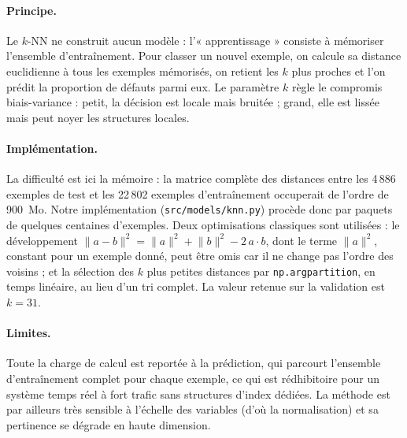 \paragraph{Principe.}
Le $k$-NN \cite{cover1967knn} ne construit aucun modèle : l'« apprentissage »
consiste à mémoriser l'ensemble d'entraînement. Pour classer un nouvel exemple,
on calcule sa distance euclidienne à tous les exemples mémorisés, on retient
les $k$ plus proches et l'on prédit la proportion de défauts parmi eux. Le
paramètre $k$ règle le compromis biais-variance : petit, la décision est locale
mais bruitée ; grand, elle est lissée mais peut noyer les structures locales.

\paragraph{Implémentation.}
La difficulté est ici la mémoire : la matrice complète des distances entre les
4\,886 exemples de test et les 22\,802 exemples d'entraînement occuperait de
l'ordre de 900~Mo. Notre implémentation (\texttt{src/models/knn.py}) procède
donc par paquets de quelques centaines d'exemples. Deux optimisations
classiques sont utilisées : le développement
$\lVert a - b \rVert^2 = \lVert a \rVert^2 + \lVert b \rVert^2 - 2\,a \cdot b$,
dont le terme $\lVert a \rVert^2$, constant pour un exemple donné, peut être
omis car il ne change pas l'ordre des voisins ; et la sélection des $k$ plus
petites distances par \texttt{np.argpartition}, en temps linéaire, au lieu d'un
tri complet. La valeur retenue sur la validation est $k = 31$.

\paragraph{Limites.}
Toute la charge de calcul est reportée à la prédiction, qui parcourt
l'ensemble d'entraînement complet pour chaque exemple, ce qui est rédhibitoire
pour un système temps réel à fort trafic sans structures d'index dédiées. La méthode
est par ailleurs très sensible à l'échelle des variables (d'où la
normalisation) et sa pertinence se dégrade en haute dimension.
